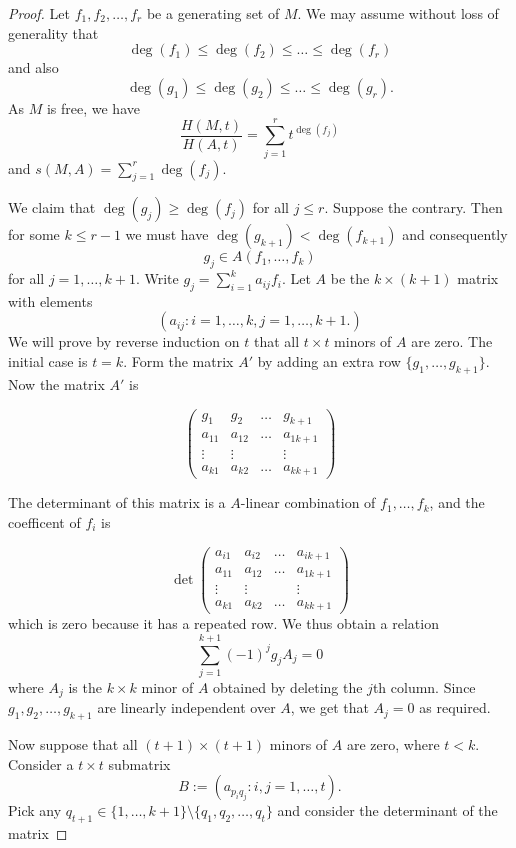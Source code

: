 \documentclass[a4paper]{amsart}
\newtheorem*{Corollary of Conjecture}{Corollary of Conjecture}
\theoremstyle{definition}
\theoremstyle{remark}
\theoremstyle{Acknowledgments}
\begin{document}
\begin{proof} Let $f_1, f_2, \ldots, f_r$ be a generating set of $M$.  We may assume without loss of generality that 
\[\deg(f_1) \leq \deg(f_2) \leq \ldots \leq \deg(f_r)\] and also
\[\deg(g_1) \leq \deg(g_2) \leq \ldots \leq \deg(g_r).\] As $M$ is free, we have
\[\frac{H(M,t)}{H(A,t)} = \sum_{j=1}^r t^{\deg(f_j)}\] and $s(M,A) = \sum_{j=1}^r \deg(f_j) $.

We claim that $\deg(g_j) \geq \deg(f_j)$ for all $j \leq r$. Suppose the contrary. Then for some $k \leq r-1$ we must have $\deg(g_{k+1})< \deg(f_{k+1})$ and consequently
\[g_j \in A(f_1, \ldots, f_k)\] for all $j = 1, \ldots, k+1$. 
Write $g_j = \sum_{i=1}^k a_{ij} f_i$. Let $A$ be the $k \times( k+1)$ matrix with elements \[ (a_{ij}: i=1, \ldots, k, j = 1, \ldots, k+1.)\]
We will prove by reverse induction on $t$ that all $t \times t$ minors of $A$ are zero. The initial case is $t=k$. Form the matrix $A'$ by adding an extra row $\{g_1, \ldots, g_{k+1}\}$. Now the matrix $A'$ is

\[\begin{pmatrix} g_1 & g_2 & \ldots & g_{k+1} \\ a_{11} & a_{12} & \ldots & a_{1 k+1} \\
\vdots & \vdots & & \vdots \\ a_{k1} & a_{k2} & \ldots & a_{k k+1} \end{pmatrix}\] 

The determinant of this matrix is a $A$-linear combination of $f_1, \ldots, f_{k}$, and the coefficent of $f_i$ is

\[\det \begin{pmatrix} a_{i1} & a_{i2} & \ldots & a_{i k+1} \\ a_{11} & a_{12} & \ldots & a_{1 k+1} \\
\vdots & \vdots & & \vdots \\ a_{k1} & a_{k2} & \ldots & a_{k k+1} \end{pmatrix}\] which is zero because it has a repeated row. We thus obtain a relation
\[\sum_{j=1}^{k+1} (-1)^j g_j A_j = 0\] where $A_j$ is the $k \times k$ minor of $A$ obtained by deleting the $j$th column. Since $g_1, g_2, \ldots, g_{k+1}$ are linearly independent over $A$, we get that $A_j = 0$ as required.

Now suppose that all $(t+1) \times (t+1)$ minors of $A$ are zero, where $t<k$. Consider a $t \times t$ submatrix
\[B:= (a_{p_i q_j}: i,j = 1, \ldots, t).\] Pick any $q_{t+1} \in \{1, \ldots, k+1\} \setminus \{q_1, q_2, \ldots, q_t\}$ and consider the determinant of the matrix 


\end{proof}
\end{document}
